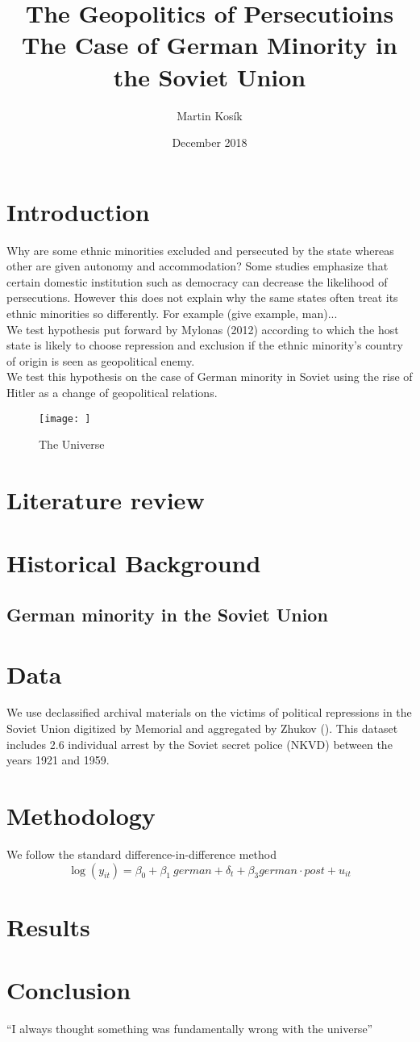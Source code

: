 \documentclass{article}
\title{The Geopolitics of Persecutioins \\
  \large The Case of German Minority in the Soviet Union}
\author{Martin Kosík}
\date{December 2018}
\begin{document}
\maketitle


\section{Introduction}
Why are some ethnic minorities excluded and persecuted by the state whereas other are given autonomy and accommodation? Some studies emphasize that certain domestic institution such as democracy can decrease the likelihood of persecutions. However this does not explain why the same states often treat its ethnic minorities so differently.  For example (give example, man)...\\
We test hypothesis put forward by Mylonas (2012) according to which the host state is likely to choose repression and exclusion if the ethnic minority's country of origin is seen as geopolitical enemy. \\
We test this hypothesis on the case of German minority in Soviet using the rise of Hitler as a change of geopolitical relations. 


\begin{figure}[h!]
\centering
\texttt{[image: ]}
\caption{The Universe}
\label{fig:universe}
\end{figure}
\section{Literature review}

\section{Historical Background}
\subsection{German minority in the Soviet Union}
\section{Data}
We use declassified archival materials on the victims of political repressions in the Soviet Union digitized by Memorial and aggregated by Zhukov (). This dataset includes 2.6 individual arrest by the Soviet secret police (NKVD) between  the years 1921 and 1959.
\section{Methodology}
We follow the standard difference-in-difference method
$$ \log\left(y_{it}\right) = \beta_0 + \beta_1 \: german + \delta_t + \beta_3 german \cdot post + u_{it} $$

\section{Results}

\section{Conclusion}
``I always thought something was fundamentally wrong with the universe'' \citep{adams1995hitchhiker}





\end{document}
